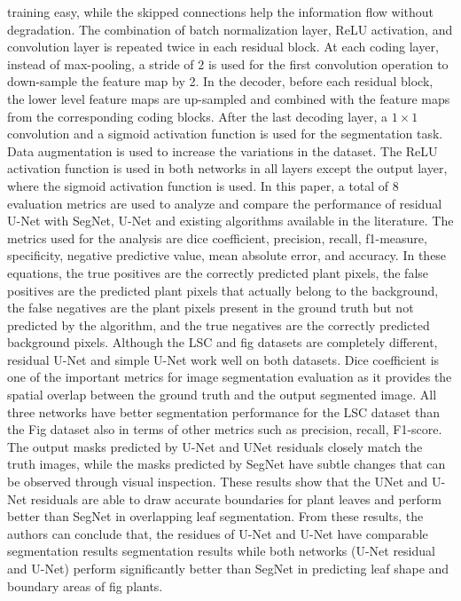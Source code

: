 training easy, while the skipped connections help the information flow without degradation. The combination of batch normalization layer, ReLU activation, and
convolution layer is repeated twice in each residual block. At each coding layer, instead of max-pooling, a stride of 2 is used for the first convolution operation
to down-sample the feature map by 2. In the decoder, before each residual block, the lower level feature maps are up-sampled and combined with the feature maps from
the corresponding coding blocks. After the last decoding layer, a $1 \times 1$ convolution and a sigmoid activation function is used for the segmentation task. Data
augmentation is used to increase the variations in the dataset. The ReLU activation function is used in both networks in all layers except the output layer, where
the sigmoid activation function is used. In this paper, a total of 8 evaluation metrics are used to analyze and compare the performance of residual U-Net with SegNet,
U-Net and existing algorithms available in the literature. The metrics used for the analysis are dice coefficient, precision, recall, f1-measure, specificity, negative 
predictive value, mean absolute error, and accuracy. In these equations, the true positives are the correctly predicted plant pixels, the false positives are the predicted
plant pixels that actually belong to the background, the false negatives are the plant pixels present in the ground truth but not predicted by the algorithm, and the
true negatives are the correctly predicted background pixels. Although the LSC and fig datasets are completely different, residual U-Net and simple U-Net work well on
both datasets. Dice coefficient is one of the important metrics for image segmentation evaluation as it provides the spatial overlap between the ground truth and the
output segmented image. All three networks have better segmentation performance for the LSC dataset than the Fig dataset also in terms of other metrics such as precision,
recall, F1-score. The output masks predicted by U-Net and UNet residuals closely match the truth images, while the masks predicted by SegNet have subtle changes that
can be observed through visual inspection. These results show that the UNet and U-Net residuals are able to draw accurate boundaries for plant leaves and perform better 
than SegNet in overlapping leaf segmentation. From these results, the authors can conclude that, the residues of U-Net and U-Net have comparable segmentation results 
segmentation results while both networks (U-Net residual and U-Net) perform significantly better than SegNet in predicting leaf shape and boundary areas of fig plants.
